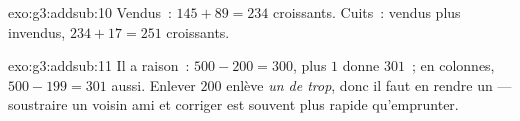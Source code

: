 \begin{solution}{exo:g3:addsub:10}
Vendus~: $145 + 89 = 234$ croissants. Cuits~: vendus plus invendus,
$234 + 17 = 251$ croissants.
\end{solution}

\begin{solution}{exo:g3:addsub:11}
Il a raison~: $500 - 200 = 300$, plus $1$ donne $301$~; en colonnes,
$500 - 199 = 301$ aussi. Enlever $200$ enlève \emph{un de trop},
donc il faut en rendre un --- soustraire un voisin ami et corriger
est souvent plus rapide qu'emprunter.
\end{solution}
